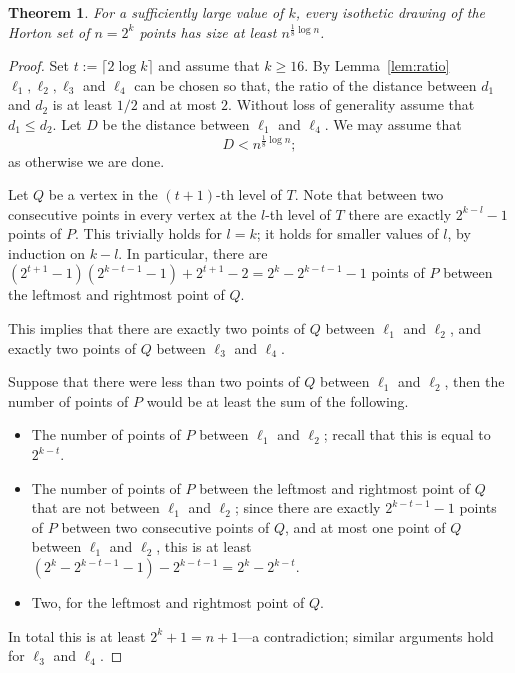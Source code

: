 \documentclass{article}
\newtheorem{theorem}{Theorem}[section]
\begin{document}
\begin{theorem}\label{thm:lower_isothetic}
For a sufficiently large value of $k$, every isothetic drawing of the Horton set of $n=2^k$ points has size
at least $n^{\frac{1}{8} \log n}$.
\end{theorem}
\begin{proof}
Set $t:=\lceil 2\log k\rceil$ and assume that $k\ge 16$. By Lemma~\ref{lem:ratio} 
$\ell_1, \ell_2, \ell_3$ and $\ell_4$ can be chosen so that, the ratio of the distance
between $d_1$ and $d_2$ is at least $1/2$ 
and at most $2$.  Without loss of generality assume that $d_1 \le d_2$.
Let $D$ be the distance between $\ell_1$ and $\ell_4$. We may assume that
\[D< n^{\frac{1}{8}\log n};\] as otherwise we are done.

Let $Q$ be a vertex in the $(t+1)$-th level of $T$. 
Note that between two consecutive points in every vertex at the $l$-th level
of $T$ there are exactly $2^{k-l}-1$ points of $P$. This trivially holds
for  $l=k$; it holds for smaller values of $l$, by induction
on $k-l$. In particular,
there are $(2^{t+1}-1)(2^{k-t-1}-1)+2^{t+1}-2=2^k-2^{k-t-1}-1$ points
of $P$ between the leftmost and rightmost point of $Q$.

This implies that 
there are exactly two points of $Q$ between $\ell_1$ and $\ell_{2}$,
and exactly two points of $Q$ between $\ell_{3}$ and $\ell_4$. 

Suppose that there
were less than two points of $Q$ between $\ell_1$ and $\ell_{2}$, then the number of points of $P$ would
be at least the sum of the following. 
\begin{itemize}
 \item The number of points of $P$ between $\ell_1$ and $\ell_{2}$; recall that this is
 equal to $2^{k-t}$.

\item The number
of points of $P$ between the leftmost and rightmost point of $Q$ that are not between  
$\ell_1$ and $\ell_{2}$;  since there are exactly $2^{k-t-1}-1$ points of $P$ between two consecutive points of $Q$,
and at most one point of $Q$ between $\ell_1$ and $\ell_2$, this is at least $(2^k-2^{k-t-1}-1)-2^{k-t-1}=2^k-2^{k-t}$.

\item Two, for the leftmost and rightmost point of $Q$.
\end{itemize}

In total this is at least $2^k+1=n+1$---a contradiction; similar arguments hold for $\ell_3$ and $\ell_4$.


\end{proof}
\end{document}
